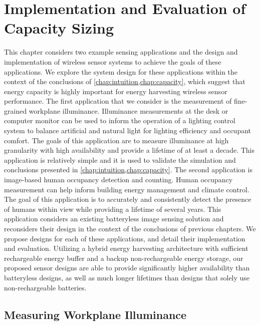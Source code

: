 \chapter{Implementation and Evaluation of Capacity Sizing}
\label{chap:impl}

This chapter considers two example sensing applications and the design and implementation of wireless sensor systems to achieve the goals of these applications.
We explore the system design for these applications within the context of the conclusions of \cref{chap:intuition,chap:capacity}, which suggest that energy capacity is highly important for energy harvesting wireless sensor performance.
The first application that we consider is the measurement of fine-grained workplane illuminance. 
Illuminance measurements at the desk or computer monitor can be used to inform the operation of a lighting control system to balance artificial and natural light for lighting efficiency and occupant comfort. 
The goals of this application are to measure illuminance at high granularity with high availability and provide a lifetime of at least a decade. 
This application is relatively simple and it is used to validate the simulation and conclusions presented in \cref{chap:intuition,chap:capacity}.
The second application is image-based human occupancy detection and counting. 
Human occupancy measurement can help inform building energy management and climate control.
The goal of this application is to accurately and consistently detect the presence of humans within view while providing a lifetime of several years.
This application considers an existing batteryless image sensing solution and reconsiders their design in the context of the conclusions of previous chapters.
We propose designs for each of these applications, and detail their implementation and evaluation.
Utilizing a hybrid energy harvesting architecture with sufficient rechargeable energy buffer and a backup non-rechargeable energy storage, our proposed sensor designs are able to provide significantly higher availability than batteryless designs, as well as much longer lifetimes than designs that solely use non-rechargeable batteries. 

\section{Measuring Workplane Illuminance}
\label{sec:impl:permamote}



